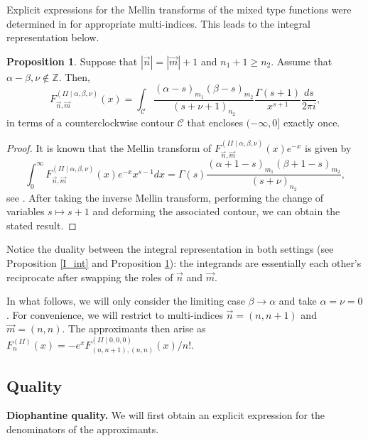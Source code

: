 \documentclass[a4paper,12pt,oneside]{article}
\theoremstyle{definition}
\newtheorem{prop}[defi]{Proposition}
\newcommand{\Z}{\mathbb{Z}}
\newcommand{\sz}[1]{\left| \vec{#1} \right|}
\begin{document}
Explicit expressions for the Mellin transforms of the mixed type functions were determined in \cite[Section 4.1]{VAWolfs} for appropriate multi-indices. This leads to the integral representation below.
    
\begin{prop} \label{II_int}
Suppose that $\sz{n}=\sz{m}+1$ and $n_1+1\geq n_2$. Assume that $\alpha-\beta,\nu\not\in\Z$. Then,
   $$ F_{\vec{n},\vec{m}}^{(II\mid \alpha,\beta,\nu)}(x) = \int_{\mathcal{C}} \frac{(\alpha-s)_{m_1} (\beta-s)_{m_2}}{(s+\nu+1)_{n_2}} \frac{\Gamma(s+1)}{x^{s+1}} \frac{ds}{2\pi i}, $$
   in terms of a counterclockwise contour $\mathcal{C}$ that encloses $(-\infty,0]$ exactly once.
\end{prop}
\begin{proof}
It is known that the Mellin transform of $F_{\vec{n},\vec{m}}^{(II\mid \alpha,\beta,\nu)}(x) e^{-x}$ is given by
$$ \int_0^\infty F_{\vec{n},\vec{m}}^{(II\mid \alpha,\beta,\nu)}(x) e^{-x} x^{s-1} dx = \Gamma(s) \frac{(\alpha+1-s)_{m_1} (\beta+1-s)_{m_2}}{(s+\nu)_{n_2}},$$
see \cite[Lemma 4.1]{VAWolfs}. After taking the inverse Mellin transform, performing the change of variables $s\mapsto s+1$ and deforming the associated contour, we can obtain the stated result.
\end{proof}

Notice the duality between the integral representation in both settings (see Proposition \ref{I_int} and Proposition \ref{II_int}): the integrands are essentially each other's reciprocate after swapping the roles of $\vec{n}$ and ${\vec{m}}$.
\medbreak

In what follows, we will only consider the limiting case $\beta\to\alpha$ and take $\alpha=\nu=0$. For convenience, we will restrict to multi-indices $\vec{n} = (n,n+1)$ and $\vec{m} = (n,n)$. The approximants then arise as $F_{n}^{(II)}(x) = - e^{x} F_{(n,n+1),(n,n)}^{(II\mid 0,0,0)}(x)/n!$. 

\subsection{Quality} \label{GC_proof}

\textbf{Diophantine quality.} We will first obtain an explicit expression for the denominators of the approximants. 
\end{document}

